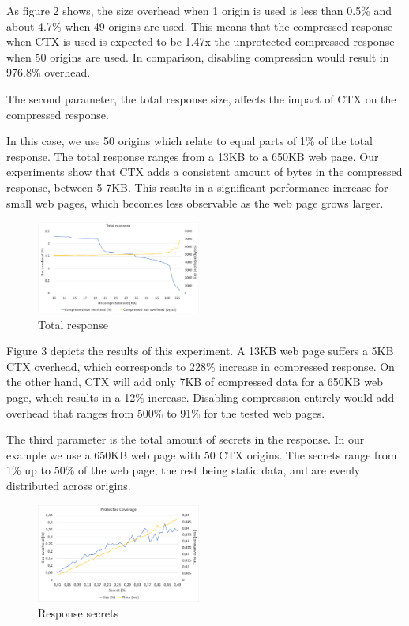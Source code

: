\documentclass[conference, letterpaper, 10pt]{IEEEtran}
\begin{document}
As figure 2 shows, the size overhead when 1 origin is used is less than 0.5\%
and about 4.7\% when 49 origins are used. This means that the compressed
response when CTX is used is expected to be 1.47x the unprotected compressed
response when 50 origins are used. In comparison, disabling compression would
result in 976.8\% overhead.

The second parameter, the total response size, affects the impact of CTX on the
compressed response.

In this case, we use 50 origins which relate to equal parts of 1\% of the total
response. The total response ranges from a 13KB to a 650KB web page. Our
experiments show that CTX adds a consistent amount of bytes in the compressed
response, between 5-7KB. This results in a significant performance increase for
small web pages, which becomes less observable as the web page grows larger.

   \begin{figure}[thpb]
      \centering
      \includegraphics[width=0.48\textwidth]{experiments/total_response.png}
      \caption{Total response}
   \end{figure}

Figure 3 depicts the results of this experiment. A 13KB web page suffers a 5KB
CTX overhead, which corresponds to 228\% increase in compressed response. On the
other hand, CTX will add only 7KB of compressed data for a 650KB web page, which
results in a 12\% increase.  Disabling compression entirely would add overhead
that ranges from 500\% to 91\% for the tested web pages.

The third parameter is the total amount of secrets in the response. In our
example we use a 650KB web page with 50 CTX origins. The secrets range from 1\%
up to 50\% of the web page, the rest being static data, and are evenly
distributed across origins.

   \begin{figure}[thpb]
      \centering
      \includegraphics[width=0.48\textwidth]{experiments/response_secrets.png}
      \caption{Response secrets}
   \end{figure}
\end{document}
